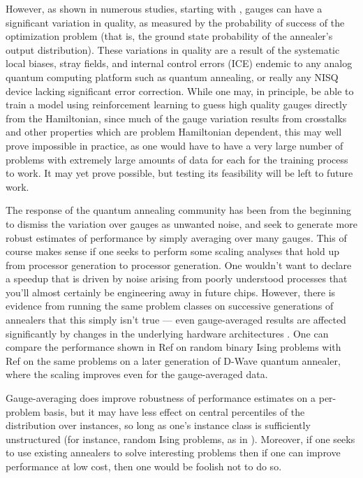 However, as shown in numerous studies, starting with \cite{q108}, gauges can have a significant variation in quality, as measured by the probability of success of the optimization problem (that is, the ground state probability of the annealer's output distribution). These variations in quality are a result of the systematic local biases, stray fields, and internal control errors (ICE) endemic to any analog quantum computing platform such as quantum annealing, or really any NISQ device lacking significant error correction. While one may, in principle, be able to train a model using reinforcement learning to guess high quality gauges directly from the Hamiltonian, since much of the gauge variation results from crosstalks and other properties which are problem Hamiltonian dependent, this may well prove impossible in practice, as one would have to have a very large number of problems with extremely large amounts of data for each for the training process to work. It may yet prove possible, but testing its feasibility will be left to future work.

The response of the quantum annealing community has been from the beginning to dismiss the variation over gauges as unwanted noise, and seek to generate more robust estimates of performance by simply averaging over many gauges. This of course makes sense if one seeks to perform some scaling analyses that hold up from processor generation to processor generation. One wouldn't want to declare a speedup that is driven by noise arising from poorly understood processes that you'll almost certainly be engineering away in future chips. However, there is evidence from running the same problem classes on successive generations of annealers that this simply isn't true --- even gauge-averaged results are affected significantly by changes in the underlying hardware architectures \cite{pokharel2017performance}. One can compare the performance shown in Ref \cite{q108} on random binary Ising problems with Ref \cite{speedup} on the same problems on a later generation of D-Wave quantum annealer, where the scaling improves even for the gauge-averaged data.

Gauge-averaging does improve robustness of performance estimates on a per-problem basis, but it may have less effect on central percentiles of the distribution over instances, so long as one's instance class is sufficiently unstructured (for instance, random Ising problems, as in \cite{speedup}). Moreover, if one seeks to use existing annealers to solve interesting problems then if one can improve performance at low cost, then one would be foolish not to do so.

